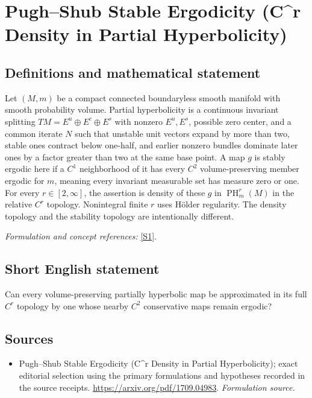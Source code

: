 \documentclass[11pt]{article}
\begin{document}
\section*{\texorpdfstring{Pugh–Shub Stable Ergodicity (C\textasciicircum{}r Density in Partial Hyperbolicity)}{Pugh–Shub Stable Ergodicity (C\textasciicircum{}r Density in Partial Hyperbolicity)}}\label{30006899}
\subsection{Definitions and mathematical statement}
Let $(M,m)$ be a compact connected boundaryless smooth manifold with smooth probability volume. Partial hyperbolicity is a continuous invariant splitting $TM=E^u\oplus E^c\oplus E^s$ with nonzero $E^u,E^s$, possible zero center, and a common iterate $N$ such that unstable unit vectors expand by more than two, stable ones contract below one-half, and earlier nonzero bundles dominate later ones by a factor greater than two at the same base point. A map $g$ is stably ergodic here if a $C^1$ neighborhood of it has every $C^2$ volume-preserving member ergodic for $m$, meaning every invariant measurable set has measure zero or one. For every $r\in[2,\infty]$, the assertion is density of these $g$ in $\operatorname{PH}_m^r(M)$ in the relative $C^r$ topology. Nonintegral finite $r$ uses H\"older regularity. The density topology and the stability topology are intentionally different.
\par\smallskip\textit{Formulation and concept references:} \href{https://arxiv.org/pdf/1709.04983}{[S1]}.

\subsection{Short English statement}
Can every volume-preserving partially hyperbolic map be approximated in its full $C^r$ topology by one whose nearby $C^2$ conservative maps remain ergodic?
\subsection{Sources}
\begin{itemize}
\item[S1]Pugh–Shub Stable Ergodicity (C\textasciicircum{}r Density in Partial Hyperbolicity); exact editorial selection using the primary formulations and hypotheses recorded in the source receipts.
\url{https://arxiv.org/pdf/1709.04983}.
\textit{Formulation source.}
\end{itemize}
\end{document}
